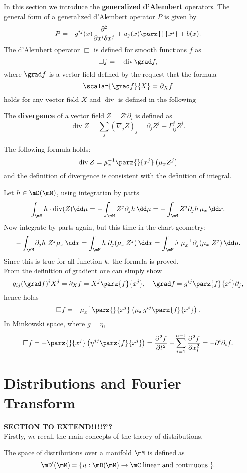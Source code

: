 In this section we introduce the \textbf{generalized d'Alembert} operators. The general form of a generalized d'Alembert operator $P$ is given by
\[	P=-g^{ij}(x)\frac{\partial^2}{\partial x^i\partial x^j}+a_j(x)\parz{}{x^j}+b(x).			\]
The d'Alembert operator $\Box$ is defined for smooth functions $f$ as
\[	\Box f=-\operatorname{div}\grad f,	\]
where $\grad f$ is a vector field defined by the request that the formula $$\scalar{\grad f}{X}=\partial_X f$$ holds for any vector field $X$ and $\operatorname{div}$ is defined in the following
\begin{definition}
	The \textbf{divergence} of a vector field $Z=Z^i\partial_i$ is defined as
	\[	\operatorname{div}Z=\sum_{j}(\nabla_j Z)_j=\partial_jZ^j+\Gamma_{ij}^jZ^j.	\]
\end{definition}

\begin{prop}
	The following formula holds:
	\[	\operatorname{div}Z=\mu_x^{-1}\parz{}{x^j}\left(\mu_xZ^j\right)	\]
	and the definition of divergence is consistent with the definition of integral.
\end{prop}
\Proof Let $h\in\mD(\mM)$, using integration by parts
\[	\int_{\mM} h\cdot\operatorname{div}(Z)\dd\mu=-\int_\mM Z^j \partial_j h\,\dd\mu = -\int_\mM Z^j \partial_j h\, \mu_x\,\dd x.	\]
Now integrate by parts again, but this time in the chart geometry:
\[	-\int_\mM \partial_j h\  Z^j \mu_x\, \dd x= \int_\mM h\ \partial_j (\mu_x\, Z^j)\, \dd x = \int_\mM h\ \mu_x^{-1}\partial_j(\mu_x\ Z^j)\, \dd\mu.		\]
Since this is true for all function $h$, the formula is proved.\endproof\\

From the definition of gradient one can simply show
\[g_{ij}(\grad f)^iX^j=\partial_X f=X^j\parz{f}{x^j},\quad \grad f=g^{ij}\parz{f}{x^i}\partial_j, \]
hence holds
\[	\Box f=-\mu_x^{-1}\parz{}{x^j}\left(\mu_x\, g^{ij}\parz{f}{x^i}\right).	\]
In Minkowski space, where $g=\eta$,
\[	\Box f=-\parz{}{x^j}\left(\eta^{jj}\parz{f}{x^j}\right)=\frac{\partial^2f}{\partial t^2}-\sum_{i=1}^{n-1}\frac{\partial^2f}{\partial x_i^2}=-\partial^i\partial_if.		\]

\section{Distributions and Fourier Transform}
\large{\textbf{SECTION TO EXTEND!1!!?'?}}\\

Firstly, we recall the main concepts of the theory of distributions.
\begin{definition}
	The space of distributions over a manifold $\mM$ is defined as
	\[	\mD'(\mM)=\{u:\mD(\mM)\to\mC\text{ linear and continuous }   \}.				\]
\end{definition}



